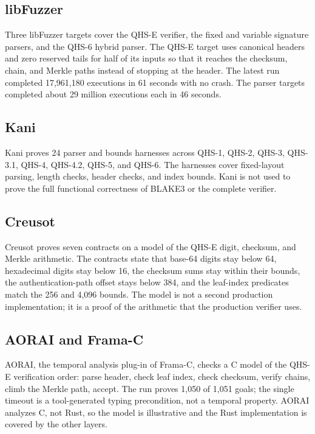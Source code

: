 \documentclass[11pt,a4paper]{article}
\begin{document}
\subsection{libFuzzer}

Three libFuzzer targets cover the QHS-E verifier, the fixed and variable
signature parsers, and the QHS-6 hybrid parser. The QHS-E target uses canonical
headers and zero reserved tails for half of its inputs so that it reaches the
checksum, chain, and Merkle paths instead of stopping at the header. The latest
run completed 17,961,180 executions in 61 seconds with no crash. The parser
targets completed about 29 million executions each in 46 seconds.

\subsection{Kani}

Kani proves 24 parser and bounds harnesses across QHS-1, QHS-2, QHS-3,
QHS-3.1, QHS-4, QHS-4.2, QHS-5, and QHS-6. The harnesses cover fixed-layout
parsing, length checks, header checks, and index bounds. Kani is not used to
prove the full functional correctness of BLAKE3 or the complete verifier.

\subsection{Creusot}

Creusot proves seven contracts on a model of the QHS-E digit, checksum, and
Merkle arithmetic. The contracts state that base-64 digits stay below 64,
hexadecimal digits stay below 16, the checksum sums stay within their bounds,
the authentication-path offset stays below 384, and the leaf-index predicates
match the 256 and 4,096 bounds. The model is not a second production
implementation; it is a proof of the arithmetic that the production verifier
uses.

\subsection{AORAI and Frama-C}

AORAI, the temporal analysis plug-in of Frama-C, checks a C model of the QHS-E
verification order: parse header, check leaf index, check checksum, verify
chains, climb the Merkle path, accept. The run proves 1,050 of 1,051 goals; the
single timeout is a tool-generated typing precondition, not a temporal
property. AORAI analyzes C, not Rust, so the model is illustrative and the Rust
implementation is covered by the other layers.
\end{document}
